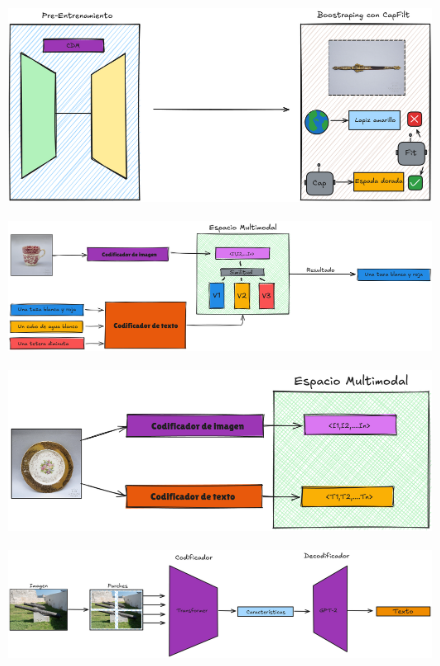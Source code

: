 \begin{figure}
	\centering
	\includegraphics[width=1\linewidth]{Graphics/BLIP}
	\caption{}
	\label{fig:blip}
\end{figure}
\begin{figure}
	\centering
	\includegraphics[width=1\linewidth]{Graphics/run_clip}
	\caption{}
	\label{fig:runclip}
\end{figure}
\begin{figure}
	\centering
	\includegraphics[width=1\linewidth]{Graphics/train_clip}
	\caption{}
	\label{fig:trainclip}
\end{figure}
\begin{figure}
	\centering
	\includegraphics[width=1\linewidth]{Graphics/ViT}
	\caption{}
	\label{fig:vit}
\end{figure}
